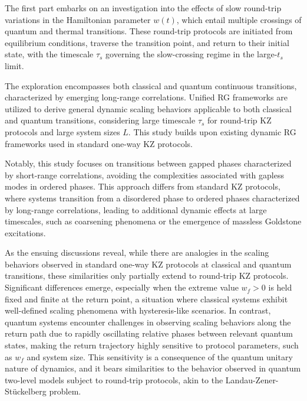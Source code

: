 The first part embarks on an investigation into the effects of slow round-trip variations in the Hamiltonian parameter $w(t)$, which entail multiple crossings of quantum and thermal transitions. These round-trip protocols are initiated from equilibrium conditions, traverse the transition point, and return to their initial state, with the timescale $\tau_s$ governing the slow-crossing regime in the large-$t_s$ limit.

The exploration encompasses both classical and quantum continuous transitions, characterized by emerging long-range correlations. Unified RG frameworks are utilized to derive general dynamic scaling behaviors applicable to both classical and quantum transitions, considering large timescale $\tau_s$ for round-trip KZ protocols and large system sizes $L$. This study builds upon existing dynamic RG frameworks used in standard one-way KZ protocols.

Notably, this study focuses on transitions between gapped phases characterized by short-range correlations, avoiding the complexities associated with gapless modes in ordered phases. This approach differs from standard KZ protocols, where systems transition from a disordered phase to ordered phases characterized by long-range correlations, leading to additional dynamic effects at large timescales, such as coarsening phenomena or the emergence of massless Goldstone excitations.


As the ensuing discussions reveal, while there are analogies in the scaling behaviors observed in standard one-way KZ protocols at classical and quantum transitions, these similarities only partially extend to round-trip KZ protocols. Significant differences emerge, especially when the extreme value $w_f > 0$ is held fixed and finite at the return point, a situation where classical systems exhibit well-defined scaling phenomena with hysteresis-like scenarios. In contrast, quantum systems encounter challenges in observing scaling behaviors along the return path due to rapidly oscillating relative phases between relevant quantum states, making the return trajectory highly sensitive to protocol parameters, such as $w_f$ and system size. This sensitivity is a consequence of the quantum unitary nature of dynamics, and it bears similarities to the behavior observed in quantum two-level models subject to round-trip protocols, akin to the Landau-Zener-Stückelberg problem.\\




